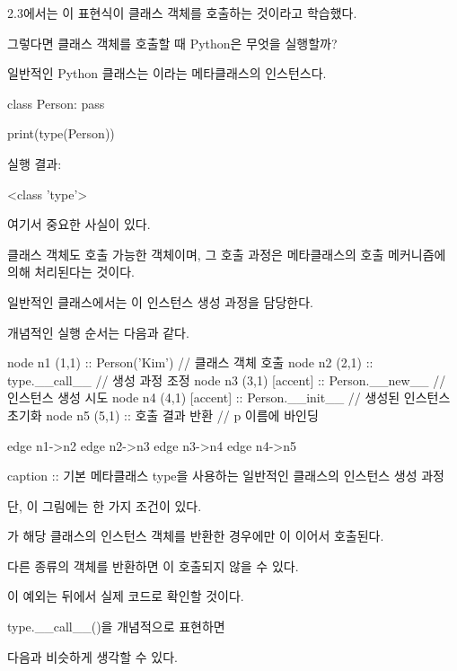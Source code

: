2.3에서는 이 표현식이 클래스 객체를 호출하는 것이라고 학습했다.

그렇다면 클래스 객체를 호출할 때 Python은 무엇을 실행할까?

일반적인 Python 클래스는 이라는 메타클래스의 인스턴스다.

\begin{dhkcode}
class Person:
    pass

print(type(Person))
\end{dhkcode}

실행 결과:

\begin{dhkzsh}
<class 'type'>
\end{dhkzsh}

여기서 중요한 사실이 있다.

클래스 객체도 호출 가능한 객체이며, 그 호출 과정은 메타클래스의 호출 메커니즘에 의해 처리된다는 것이다.

일반적인 클래스에서는 이 인스턴스 생성 과정을 담당한다.

개념적인 실행 순서는 다음과 같다.

\begin{dhkgraph}[uniform]
node n1 (1,1) :: Person('Kim') // 클래스 객체 호출
node n2 (2,1) :: type.__call__ // 생성 과정 조정
node n3 (3,1) [accent] :: Person.__new__ // 인스턴스 생성 시도
node n4 (4,1) [accent] :: Person.__init__ // 생성된 인스턴스 초기화
node n5 (5,1) :: 호출 결과 반환 // p 이름에 바인딩

edge n1->n2
edge n2->n3
edge n3->n4
edge n4->n5

caption :: 기본 메타클래스 type을 사용하는 일반적인 클래스의 인스턴스 생성 과정
\end{dhkgraph}

단, 이 그림에는 한 가지 조건이 있다.

가 해당 클래스의 인스턴스 객체를 반환한 경우에만 이 이어서 호출된다.

다른 종류의 객체를 반환하면 이 호출되지 않을 수 있다.

이 예외는 뒤에서 실제 코드로 확인할 것이다.

\begin{dhknote}
\begin{dhksmry}[centered]
type.__call__()을 개념적으로 표현하면
\end{dhksmry}
\end{dhknote}

다음과 비슷하게 생각할 수 있다.

